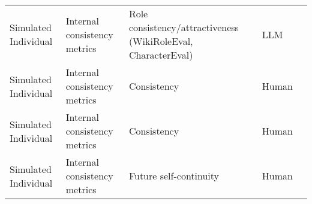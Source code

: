 \begin{small}
\begin{center}
\begin{longtable}{@{}p{}p{}p{}p{}p{}@{}}
Simulated Individual     & Internal consistency metrics        & Role consistency/attractiveness (WikiRoleEval, CharacterEval)                                                                                                                                               & LLM       & \cite{tang2024erabalenhancingroleplayingagents}                                                                                                                                                                                                                                                                                                                                                                                              \\
Simulated Individual     & Internal consistency metrics        & Consistency                                                                                                                                                                                                 & Human     & \cite{Zhang2024SpeechAgentsHS}                                                                                                                                                                                                                                                                                                                                                                                                   \\
Simulated Individual     & Internal consistency metrics        & Consistency                                                                                                                                                                                                 & Human     & \cite{mishra-etal-2023-e}                                                                                                                                                                                                                                                                                                                                                                                       \\
Simulated Individual     & Internal consistency metrics        & Future self-continuity                                                                                                                                                                                      & Human     & \cite{Pataranutaporn2024FutureYA}                                                                                                                                                                                                                                                                                                                                                                                                  \\

\end{longtable}
\end{center}
\end{small}
